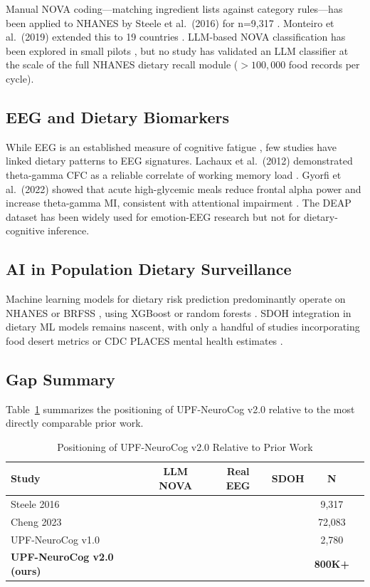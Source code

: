 \documentclass[journal]{IEEEtran}
\begin{document}
Manual NOVA coding—matching ingredient lists against category rules—has been
applied to NHANES by Steele et al.\ (2016) for n=9{,}317 \cite{steele2017}.
Monteiro et al.\ (2019) extended this to 19 countries \cite{monteiro2019}.
LLM-based NOVA classification has been explored in small pilots
\cite{zhang2024nova}, but no study has validated an LLM classifier at the scale
of the full NHANES dietary recall module ($>100{,}000$ food records per cycle).

\subsection{EEG and Dietary Biomarkers}

While EEG is an established measure of cognitive fatigue \cite{klimesch1999},
few studies have linked dietary patterns to EEG signatures. Lachaux et al.\
(2012) demonstrated theta-gamma CFC as a reliable correlate of working memory
load \cite{lachaux2012}. Gyorfi et al.\ (2022) showed that acute high-glycemic
meals reduce frontal alpha power and increase theta-gamma MI, consistent with
attentional impairment \cite{gyorfi2022}. The DEAP dataset \cite{koelstra2012}
has been widely used for emotion-EEG research but not for dietary-cognitive
inference.

\subsection{AI in Population Dietary Surveillance}

Machine learning models for dietary risk prediction predominantly operate on
NHANES \cite{nhanes2020} or BRFSS \cite{cdc2023brfss}, using XGBoost or random
forests \cite{smith2023nhanes}. SDOH integration in dietary ML models remains
nascent, with only a handful of studies incorporating food desert metrics
\cite{larson2019equity} or CDC PLACES mental health estimates \cite{cdc2023places}.

\subsection{Gap Summary}

Table~\ref{tab:gap} summarizes the positioning of UPF-NeuroCog v2.0 relative
to the most directly comparable prior work.

\begin{table}[htbp]
\caption{Positioning of UPF-NeuroCog v2.0 Relative to Prior Work}
\label{tab:gap}
\centering
\small
\begin{tabular}{lccccc}
\toprule
Study & LLM NOVA & Real EEG & SDOH & N \\
\midrule
Steele 2016 \cite{steele2017} & \texttimes & \texttimes & \texttimes & 9,317 \\
Cheng 2023 \cite{cheng2023} & \texttimes & \texttimes & \texttimes & 72,083 \\
UPF-NeuroCog v1.0 & \texttimes & \texttimes & \texttimes & 2,780 \\
\textbf{UPF-NeuroCog v2.0 (ours)} & \checkmark & \checkmark & \checkmark & \textbf{800K+} \\
\bottomrule
\end{tabular}
\end{table}
\end{document}
